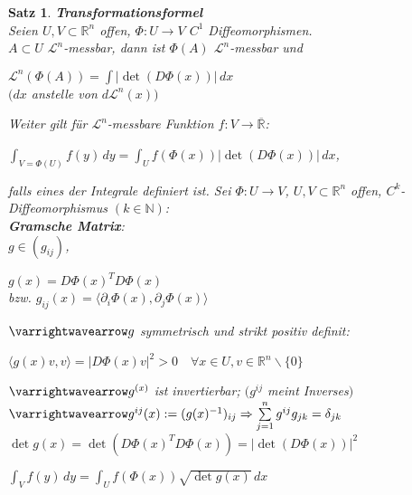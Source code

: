 \documentclass[11pt]{memoir}
\theoremstyle{changebreak}
\newtheorem{Satz}{Satz}[chapter]
\begin{document}
\begin{Satz}
\emph{\textbf{Transformationsformel}} \\
Seien $U, V \subset \mathbb R^n$ offen, $\Phi: U \rightarrow V$ $C^1$ Diffeomorphismen. \\
$A \subset U $ $\mathscr L^n$-messbar, dann ist $\Phi(A) $ $\mathscr L^n$-messbar und \\
\begin{center}
	$\mathscr L^n(\Phi(A)) = \int |\det (D\Phi(x))| \, dx$\\
	$(dx$ anstelle von $d\mathscr L^n(x))$
\end{center}
Weiter gilt für $\mathscr L^n$-messbare Funktion $f: V \rightarrow \overline{\mathbb R}$:
\begin{center}
	$\int_{V = \Phi(U)} f(y) \, dy = \int_U f(\Phi(x))|\det (D\Phi(x))|\, dx$,
\end{center}
falls eines der Integrale definiert ist.
Sei $\Phi: U \rightarrow V$, $U, V \subset \mathbb R^n$ offen, $C^k$-Diffeomorphismus $(k \in \mathbb N)$: \\


\emph{\textbf{Gramsche Matrix}}: \\
$g \in (g_{ij})$,
\begin{center}
	$g(x) = D\Phi(x)^T D \Phi(x)$ \\
	bzw. $g_{ij}(x) = \langle \partial_i \Phi(x), \partial_j \Phi(x) \rangle$
\end{center}
$\varrightwavearrow g$ symmetrisch und strikt positiv definit:
\begin{center}
	$\langle g(x)v, v\rangle = |D\Phi(x)v|^2 > 0\quad \forall x \in U, v \in \mathbb R^n\backslash \{0\}$
\end{center}
$\varrightwavearrow g^{(x)}$ ist invertierbar;
$(g^{ij}$ meint Inverses$)$ \\
$\varrightwavearrow g^{ij}(x) := (g(x)^{-1})_{ij} \Rightarrow \sum\limits_{j=1}^n g^{ij} g_{jk} = \delta_{jk}$ \\
$\det g(x) = \det(D\Phi(x)^T D \Phi(x)) = |\det(D \Phi(x))|^2$

\begin{center}
	$\int_V f(y) \, dy = \int_U f(\Phi(x)) \sqrt{\det g(x)} \, dx$
\end{center}

\end{Satz}
\end{document}
